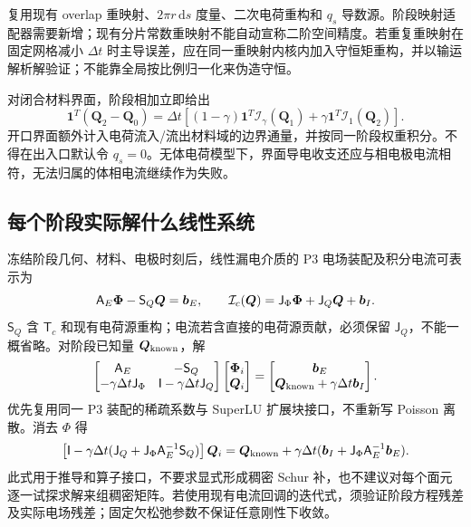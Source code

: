 \documentclass[UTF8,a4paper,11pt,fontset=fandol]{ctexart}
\numberwithin{equation}{section}
\newcommand{\dt}{\Delta t}\newcommand{\dd}{\,\mathrm d}
\newcommand{\QQ}{\bm Q}\newcommand{\pp}{\bm p}\newcommand{\EE}{\bm E}
\newcommand{\mat}[1]{\mathsf{#1}}\newcommand{\code}[1]{\nolinkurl{#1}}
\begin{document}
复用现有 overlap 重映射、$2\pi r\dd s$ 度量、二次电荷重构和 $q_s$ 导数源。阶段映射适配器需要新增；现有分片常数重映射不能自动宣称二阶空间精度。若重复重映射在固定网格减小 $\dt$ 时主导误差，应在同一重映射内核内加入守恒矩重构，并以输运解析解验证；不能靠全局按比例归一化来伪造守恒。

对闭合材料界面，阶段相加立即给出
\begin{equation}\label{eq:chargeledger}
 \bm1^T(\QQ_2-\QQ_0)=\dt\left[(1-\gamma)\bm1^T\mathcal I_\gamma(\QQ_1)
 +\gamma\bm1^T\mathcal I_1(\QQ_2)\right].
\end{equation}
开口界面额外计入电荷流入/流出材料域的边界通量，并按同一阶段权重积分。不得在出入口默认令 $q_s=0$。无体电荷模型下，界面导电收支还应与相电极电流相符，无法归属的体相电流继续作为失败。

\subsection{每个阶段实际解什么线性系统}
冻结阶段几何、材料、电极时刻后，线性漏电介质的 P3 电场装配及积分电流可表示为
\begin{equation}
 \mat A_E\bm\Phi-\mat S_Q\QQ=\bb_E,\qquad
 \mathcal I_c(\QQ)=\mat J_\Phi\bm\Phi+\mat J_Q\QQ+\bb_I.
\end{equation}
$\mat S_Q$ 含 $\mat T_c$ 和现有电荷源重构；电流若含直接的电荷源贡献，必须保留 $\mat J_Q$，不能一概省略。对阶段已知量 $\QQ_{\rm known}$，解
\begin{equation}\label{eq:eblock}
 \begin{bmatrix}
 \mat A_E&-\mat S_Q\\
 -\gamma\dt\mat J_\Phi&\mat I-\gamma\dt\mat J_Q
 \end{bmatrix}
 \begin{bmatrix}\bm\Phi_i\\\QQ_i\end{bmatrix}
 =\begin{bmatrix}\bb_E\\\QQ_{\rm known}+\gamma\dt\bb_I\end{bmatrix}.
\end{equation}
优先复用同一 P3 装配的稀疏系数与 SuperLU 扩展块接口，不重新写 Poisson 离散。消去 $\Phi$ 得
\begin{equation}
 \left[\mat I-\gamma\dt(\mat J_Q+\mat J_\Phi\mat A_E^{-1}\mat S_Q)\right]\QQ_i
 =\QQ_{\rm known}+\gamma\dt(\bb_I+\mat J_\Phi\mat A_E^{-1}\bb_E).
\end{equation}
此式用于推导和算子接口，不要求显式形成稠密 Schur 补，也不建议对每个面元逐一试探求解来组稠密矩阵。若使用现有电流回调的迭代式，须验证阶段方程残差及实际电场残差；固定欠松弛参数不保证任意刚性下收敛。
\end{document}
